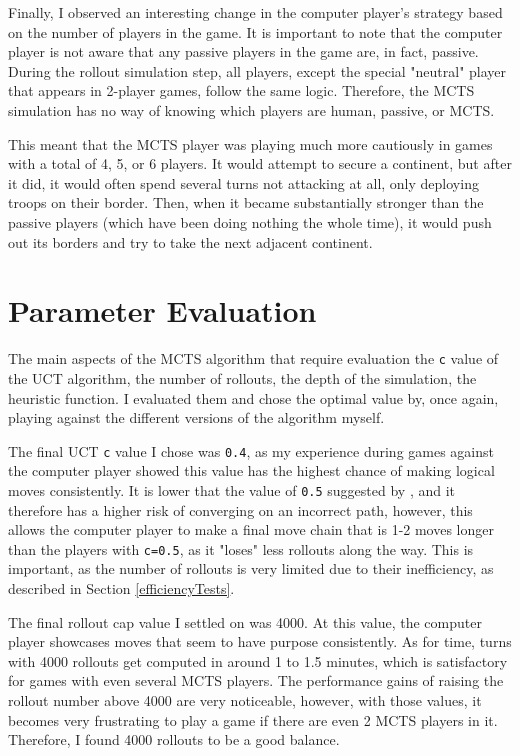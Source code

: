 Finally, I observed an interesting change in the computer player's strategy based on the number of players in the game. It is important to note that the computer player is not aware that any passive players in the game are, in fact, passive. During the rollout simulation step, all players, except the special "neutral" player that appears in 2-player games, follow the same logic. Therefore, the MCTS simulation has no way of knowing which players are human, passive, or MCTS.

This meant that the MCTS player was playing much more cautiously in games with a total of 4, 5, or 6 players. It would attempt to secure a continent, but after it did, it would often spend several turns not attacking at all, only deploying troops on their border. Then, when it became substantially stronger than the passive players (which have been doing nothing the whole time), it would push out its borders and try to take the next adjacent continent.

\section{Parameter Evaluation}
\label{parameterEvaluation}

The main aspects of the MCTS algorithm that require evaluation the \texttt{c} value of the UCT algorithm, the number of rollouts, the depth of the simulation, the heuristic function. I evaluated them and chose the optimal value by, once again, playing against the different versions of the algorithm myself.

The final UCT \texttt{c} value I chose was \texttt{0.4}, as my experience during games against the computer player showed this value has the highest chance of making logical moves consistently. It is lower that the value of \texttt{0.5} suggested by \cite{limer2020monte}, and it therefore has a higher risk of converging on an incorrect path, however, this allows the computer player to make a final move chain that is 1-2 moves longer than the players with \texttt{c=0.5}, as it "loses" less rollouts along the way. This is important, as the number of rollouts is very limited due to their inefficiency, as described in Section \ref{efficiencyTests}.

The final rollout cap value I settled on was 4000. At this value, the computer player showcases moves that seem to have purpose consistently. As for time, turns with 4000 rollouts get computed in around 1 to 1.5 minutes, which is satisfactory for games with even several MCTS players. The performance gains of raising the rollout number above 4000 are very noticeable, however, with those values, it becomes very frustrating to play a game if there are even 2 MCTS players in it. Therefore, I found 4000 rollouts to be a good balance.

